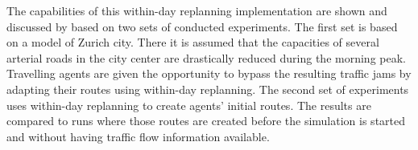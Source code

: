 The capabilities of this within-day replanning implementation are shown and discussed by \citet{Dobler_PhDThesis_2013} based on two sets of conducted experiments. The first set is based on a model of Zurich city. There it is assumed that the capacities of several arterial roads in the city center are drastically reduced during the morning peak. Travelling agents are given the opportunity to bypass the resulting traffic jams by adapting their routes using within-day replanning. The second set of experiments uses within-day replanning to create agents' initial routes. The results are compared to runs where those routes are created before the simulation is started and without having traffic flow information available.